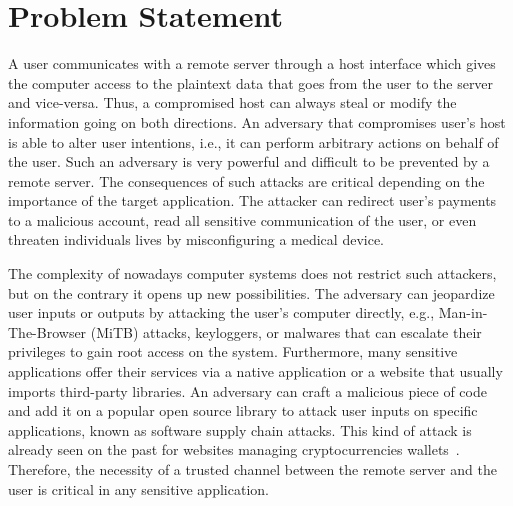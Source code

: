 \section{Problem Statement}
\label{sec:problemStatement}

\iffalse
A user communicates with a remote server through a host interface which gives %
the computer access to the plaintext data that goes from the user to the server and vice-versa. Thus, a compromised host can always steal or modify the information going on both directions. An adversary that compromises user's host is able to alter user intentions, i.e., it can perform arbitrary actions on behalf of the user. Such an adversary is very powerful and difficult to be prevented by a remote server. The consequences of such attacks are critical depending on the importance of the target application. The attacker can redirect user's payments to a malicious account, read all sensitive communication of the user, or even threaten individuals lives by misconfiguring a medical device. 

The complexity of nowadays computer systems does not restrict such attackers, but on the contrary it opens up new possibilities. The adversary can jeopardize user inputs or outputs by attacking the user's computer directly, e.g., Man-in-The-Browser (MiTB) attacks, keyloggers, or malwares that can escalate their privileges to gain root access on the system. Furthermore, many sensitive applications offer their services via a native application or a website that usually imports third-party libraries. An adversary can craft a malicious piece of code and add it on a popular open source library to attack user inputs on specific applications, known as software supply chain attacks. This kind of attack is already seen on the past for websites managing cryptocurrencies wallets~\cite{softSupplyChainAttack, jsSupplyChainAttack}. Therefore, the necessity of a trusted channel between the remote server and the user is critical in any sensitive application.


